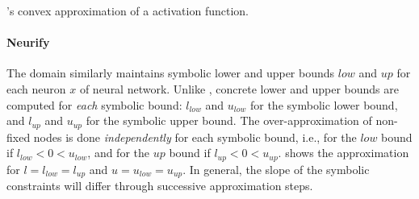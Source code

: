 \begin{marginfigure}
  \centering
  \caption{\neurify's convex approximation of a \relu{} activation function.}
\end{marginfigure}

\paragraph{Neurify}

The \neurify{} domain  similarly maintains symbolic lower and upper bounds $low$ and $up$ for each neuron $x$ of neural network. Unlike \deeppoly, concrete lower and upper bounds are computed for \emph{each} symbolic bound: $l_{low}$ and $u_{low}$ for the symbolic lower bound, and $l_{up}$ and $u_{up}$ for the symbolic upper bound.
%
The over-approximation of non-fixed \relu{} nodes is done \emph{independently} for each symbolic bound, i.e., for the $low$ bound if $l_{low} < 0 < u_{low}$, and for the $up$ bound if $l_{up} < 0 < u_{up}$.
%
 shows the approximation for $l = l_{low} = l_{up}$ and $u = u_{low} = u_{up}$. In general, the slope of the symbolic constraints will differ through successive approximation steps.

